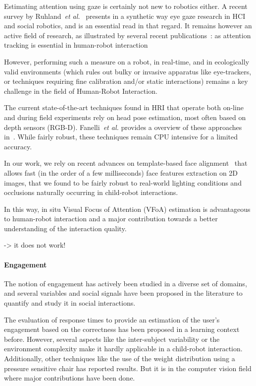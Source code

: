 \documentclass{sig-alternate}
\newcommand{\etal}{\textit{et al.}\xspace}
\begin{document}
Estimating attention using gaze is certainly not new to robotics either. A
recent survey by Ruhland~\etal~\cite{ruhland2015review} presents in a synthetic
way eye gaze research in HCI and social robotics, and is an essential read in
that regard. It remains however an active field of research, as illustrated by
several recent publications~\cite{baxter2014tracking,anzalone,kennedy2015head}:
as attention tracking is essential in human-robot interaction

However, performing such a measure on a robot, in real-time, and in ecologically
valid environments (which rules out bulky or invasive apparatus like
eye-trackers, or techniques requiring fine calibration and/or static
interactions) remains a key challenge in the field of Human-Robot Interaction.

The current state-of-the-art techniques found in HRI that operate both on-line
and during field experiments rely on head pose
estimation, most often based on depth sensors (RGB-D). Fanelli~\etal provides a
overview of these approaches in~\cite{fanelli2012real}. While fairly robust, these
techniques remain CPU intensive for a limited accuracy.

In our work, we rely on recent advances on template-based face
alignment~\cite{kazemi2014one} that allows fast (in the order of a few
milliseconds) face features extraction on 2D images, that we found to be fairly
robust to real-world lighting conditions and occlusions naturally occurring in
child-robot interactions.


In this way, in situ Visual Focus of Attention
(VFoA) estimation is advantageous to human-robot interaction and a major
contribution towards a better understanding of the interaction quality.



\cite{kennedy2015head} -> it does not work!

\paragraph{Engagement}

The notion of engagement has actively been studied in a diverse set of domains,
and several variables and social signals have been proposed in the literature to
quantify and study it in social interactions.

The evaluation of response times to provide an estimation of the user's
engagement based on the correctness has been proposed in a learning context
\cite{Beck} before. However, several aspects like the inter-subject variability
or the environment complexity make it hardly applicable in a child-robot
interaction. Additionally, other techniques \cite{Chipman07postureas} like the
use of the weight distribution using a pressure sensitive chair has reported
results. But it is in the computer vision field where major contributions have
been done. 
\end{document}
